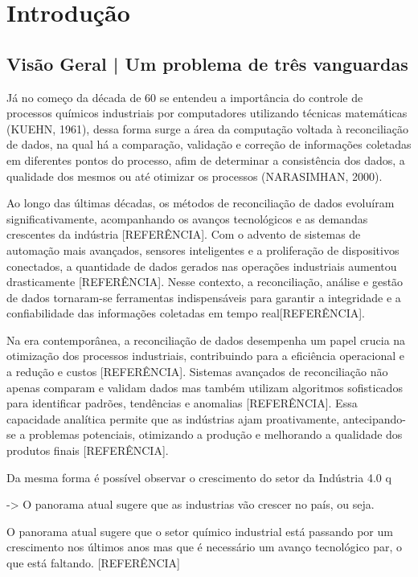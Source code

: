 \chapter[Introdução]{Introdução}

\section{Visão Geral | Um problema de três vanguardas}

Já no começo da década de 60 se entendeu a importância do controle de processos químicos industriais por computadores utilizando técnicas matemáticas (KUEHN, 1961), dessa forma surge a área da computação voltada à reconciliação de dados, na qual há a comparação, validação e correção de informações coletadas em diferentes pontos do processo, afim de determinar a consistência dos dados, a qualidade dos mesmos ou até otimizar os processos (NARASIMHAN, 2000).

Ao longo das últimas décadas, os métodos de reconciliação de dados evoluíram significativamente, acompanhando os avanços tecnológicos e as demandas crescentes da indústria [REFERÊNCIA]. Com o advento de sistemas de automação mais avançados, sensores inteligentes e a proliferação de dispositivos conectados, a quantidade de dados gerados nas operações industriais aumentou drasticamente [REFERÊNCIA]. Nesse contexto, a reconciliação, análise e gestão de dados tornaram-se ferramentas indispensáveis para garantir a integridade e a confiabilidade das informações coletadas em tempo real[REFERÊNCIA].

Na era contemporânea, a reconciliação de dados desempenha um papel crucia na otimização dos processos industriais, contribuindo para a eficiência operacional e a redução e custos [REFERÊNCIA]. Sistemas avançados de reconciliação não apenas comparam e validam dados mas também utilizam algoritmos sofisticados para identificar padrões, tendências e anomalias [REFERÊNCIA]. Essa capacidade analítica permite que as indústrias ajam proativamente, antecipando-se a problemas potenciais, otimizando a produção e melhorando a qualidade dos produtos finais [REFERÊNCIA].

Da mesma forma é possível observar o crescimento do setor da Indústria 4.0 q

-> O panorama atual sugere que as industrias vão crescer no país, ou seja.

O panorama atual sugere que o setor químico industrial está passando por um crescimento nos últimos anos 
mas que é necessário um avanço tecnológico par, o que está faltando. [REFERÊNCIA]

